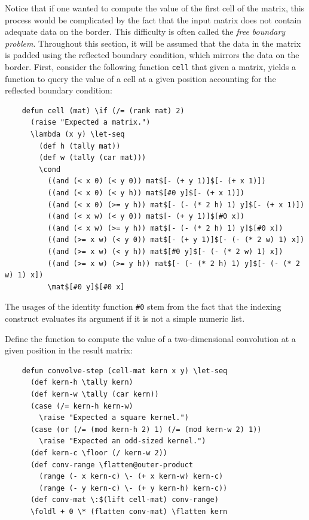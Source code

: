 Notice that if one wanted to compute the value of the first cell of the matrix, this process would be complicated by the fact that the input matrix does not contain adequate data on the border. This difficulty is often called the \textit{free boundary problem}. Throughout this section, it will be assumed that the data in the matrix is padded using the reflected boundary condition, which mirrors the data on the border. First, consider the following function \verb|cell| that given a matrix, yields a function to query the value of a cell at a given position accounting for the reflected boundary condition:

\begin{Verbatim}
    defun cell (mat) \if (/= (rank mat) 2)
      (raise "Expected a matrix.")
      \lambda (x y) \let-seq
        (def h (tally mat))
        (def w (tally (car mat)))
        \cond
          ((and (< x 0) (< y 0)) mat$[- (+ y 1)]$[- (+ x 1)])
          ((and (< x 0) (< y h)) mat$[#0 y]$[- (+ x 1)])
          ((and (< x 0) (>= y h)) mat$[- (- (* 2 h) 1) y]$[- (+ x 1)])
          ((and (< x w) (< y 0)) mat$[- (+ y 1)]$[#0 x])
          ((and (< x w) (>= y h)) mat$[- (- (* 2 h) 1) y]$[#0 x])
          ((and (>= x w) (< y 0)) mat$[- (+ y 1)]$[- (- (* 2 w) 1) x])
          ((and (>= x w) (< y h)) mat$[#0 y]$[- (- (* 2 w) 1) x])
          ((and (>= x w) (>= y h)) mat$[- (- (* 2 h) 1) y]$[- (- (* 2 w) 1) x])
          \mat$[#0 y]$[#0 x]
\end{Verbatim}

The usages of the identity function \verb|#0| stem from the fact that the indexing construct evaluates its argument if it is not a simple numeric list.

Define the function to compute the value of a two-dimensional convolution at a given position in the result matrix:

\begin{Verbatim}
    defun convolve-step (cell-mat kern x y) \let-seq
      (def kern-h \tally kern)
      (def kern-w \tally (car kern))
      (case (/= kern-h kern-w)
        \raise "Expected a square kernel.")
      (case (or (/= (mod kern-h 2) 1) (/= (mod kern-w 2) 1))
        \raise "Expected an odd-sized kernel.")
      (def kern-c \floor (/ kern-w 2))
      (def conv-range \flatten@outer-product
        (range (- x kern-c) \- (+ x kern-w) kern-c)
        (range (- y kern-c) \- (+ y kern-h) kern-c))
      (def conv-mat \:$(lift cell-mat) conv-range)
      \foldl + 0 \* (flatten conv-mat) \flatten kern
\end{Verbatim}

